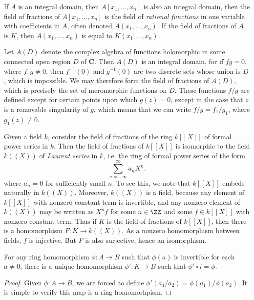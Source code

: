 \begin{example}
    If $A$ is an integral domain, then $A[x_1,\dots,x_n]$ is also an integral domain, then the field of fractions of $A[x_1,\dots,x_n]$ is the field of \emph{rational functions} in one variable with coefficients in $A$, often denoted $A(x_1,\dots,x_n)$. If the field of fractions of $A$ is $K$, then $A(x_1,\dots,x_n)$ is equal to $K(x_1,\dots,x_n)$.
\end{example}

\begin{example}
    Let $A(D)$ denote the complex algebra of functions holomorphic in some connected open region $D$ of $\mathbf{C}$. Then $A(D)$ is an integral domain, for if $fg = 0$, where $f,g \neq 0$, then $f^{-1}(0)$ and $g^{-1}(0)$ are two discrete sets whose union is $D$, which is impossible. We may therefore form the field of fractions of $A(D)$, which is precisely the set of meromorphic functions on $D$. These functions $f/g$ are defined except for certain points upon which $g(z) = 0$, except in the case that $z$ is a removable singularity of $g$, which means that we can write $f/g = f_1/g_1$, where $g_1(z) \neq 0$.
\end{example}

\begin{example}
    Given a field $k$, consider the field of fractions of the ring $k[[X]]$ of formal power series in $k$. Then the field of fractions of $k[[X]]$ is isomorphic to the field $k((X))$ of \emph{Laurent series} in $k$, i.e. the ring of formal power series of the form
    \[ \sum_{n = -\infty}^\infty a_n X^n. \]
    where $a_n = 0$ for sufficiently small $n$. To see this, we note that $k[[X]]$ embeds naturally in $k((X))$. Moreover, $k((X))$ is a field, because any element of $k[[X]]$ with nonzero constant term is invertible, and any nonzero element of $k((X))$ may be written as $X^n f$ for some $n \in \ZZ$ and some $f \in k[[X]]$ with nonzero constant term. Thus if $K$ is the field of fractions of $k[[X]]$, then there is a homomorphism $F: K \to k((X))$. As a nonzero homomorphism between fields, $f$ is injective. But $F$ is also surjective, hence an isomorphism.
\end{example}

\begin{theorem}
    For any ring homomorphism $\phi: A \to B$ such that $\phi(a)$ is invertible for each $a \neq 0$, there is a unique homomorphism $\phi': K \to B$ such that $\phi' \circ i = \phi$.
\end{theorem}
\begin{proof}
    Given $\phi: A \to B$, we are forced to define $\phi'(a_1/a_2) = \phi(a_1) / \phi(a_2)$. It is simple to verify this map is a ring homomorhpism.
\end{proof}

